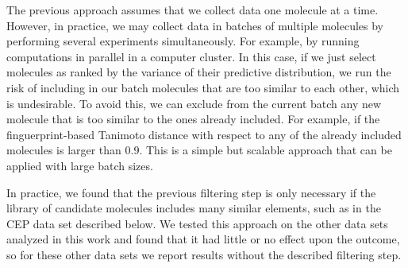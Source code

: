 The previous approach assumes that we collect data one molecule at a time. However, in practice, we may
collect data in batches of multiple molecules by performing several experiments simultaneously. For example, by running computations in parallel in a computer cluster. In this case, if we just select molecules as ranked by the variance of their predictive distribution, we run the risk of including in our batch molecules that are too similar to each other, which is undesirable. To avoid this, we can exclude from the current batch any new molecule that is too similar to the ones already included. For example, if the finguerprint-based Tanimoto distance with respect to any of the already included molecules is larger than 0.9. This is a simple but scalable approach that can be applied with large batch sizes. 

In practice, we found that the previous filtering step is only necessary if the library of candidate molecules includes many similar elements, such as in the CEP data set described below. We tested this approach on the other data sets analyzed in this work and found that it had little or no effect upon the outcome, so for these other data sets we report results without the described filtering step.